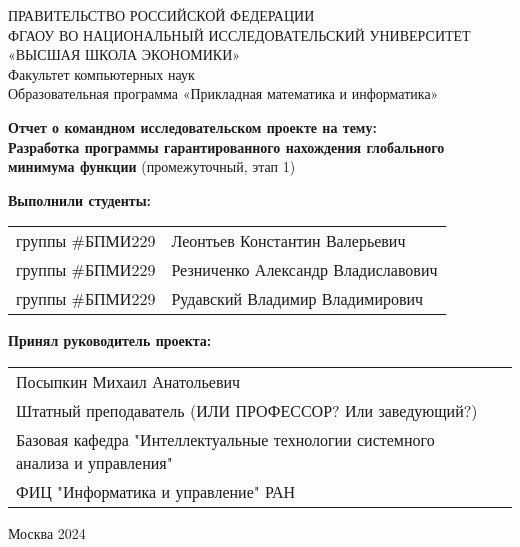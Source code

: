 \begin{titlepage}
\newpage

{
\begin{center}
ПРАВИТЕЛЬСТВО РОССИЙСКОЙ ФЕДЕРАЦИИ\\
ФГАОУ ВО НАЦИОНАЛЬНЫЙ ИССЛЕДОВАТЕЛЬСКИЙ УНИВЕРСИТЕТ\\
«ВЫСШАЯ ШКОЛА ЭКОНОМИКИ»
\\
\bigskip
Факультет компьютерных наук\\
Образовательная программа «Прикладная математика и информатика»
\end{center}
}


\begin{center}
{\bf Отчет о командном исследовательском проекте на тему:}\\
{\bf Разработка программы гарантированного нахождения глобального минимума функции}
(промежуточный, этап 1)
\end{center}

\vspace{2em}

{\bf Выполнили студенты: \vspace{2mm}}

{
\begin{tabular}{l@{\hskip 1.5cm}l}
группы \#БПМИ229 & Леонтьев Константин Валерьевич \\
группы \#БПМИ229 & Резниченко Александр Владиславович \\
группы \#БПМИ229 & Рудавский Владимир Владимирович
\end{tabular}}

\vspace{1em}
{\bf Принял руководитель проекта: \vspace{2mm}}

{
\begin{tabular}{l@{\hskip 1.5cm}l}
Посыпкин Михаил Анатольевич \\
Штатный преподаватель (ИЛИ ПРОФЕССОР? Или заведующий?)\\
Базовая кафедра
"Интеллектуальные технологии системного анализа и управления"\\
ФИЦ "Информатика и управление" РАН
\end{tabular}}

\vspace{\fill}

\begin{center}
Москва 2024
\end{center}

\end{titlepage}